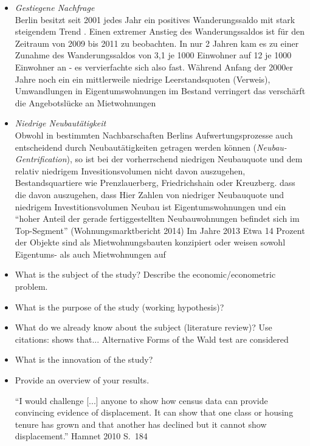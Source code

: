 \begin{itemize}

\item \textit{Gestiegene Nachfrage} \\
  Berlin besitzt seit 2001 jedes Jahr ein positives Wanderungssaldo mit stark steigendem Trend \citep{StatistischesLandesamtSachsen-Anhalt2015}. Einen extremer Anstieg des Wanderungssaldos ist für den Zeitraum von 2009 bis 2011 zu beobachten. In nur 2 Jahren kam es zu einer Zunahme des Wanderungssaldos von 3,1 je 1000 Einwohner auf 12 je 1000 Einwohner an - es vervierfachte sich also fast. Während Anfang der 2000er Jahre noch ein ein mittlerweile niedrige Leerstandsquoten (Verweis), Umwandlungen in Eigentumswohnungen im Bestand verringert das verschärft die Angebotslücke an Mietwohnungen
  \item \textit{Niedrige Neubautätigkeit}\\
    Obwohl in bestimmten Nachbarschaften Berlins Aufwertungsprozesse auch entscheidend durch Neubautätigkeiten getragen werden können (\textit{Neubau-Gentrification}), so ist bei der vorherrschend niedrigen Neubauquote und dem relativ niedrigem Invesitionsvolumen nicht davon auszugehen, Bestandsquartiere wie Prenzlauerberg, Friedrichshain oder Kreuzberg.  dass die davon auszugehen, dass Hier Zahlen von niedriger Neubauquote und niedrigem Investitionsvolumen 
   Neubau ist Eigentumswohnungen und ein "`hoher Anteil der gerade fertiggestellten Neubauwohnungen befindet sich im Top-Segment"' (Wohnungsmarktbericht 2014) Im Jahre 2013 
   Etwa 14 Prozent der Objekte sind als Mietwohnungsbauten konzipiert oder weisen sowohl Eigentums- als auch Mietwohnungen auf



    \item What is the subject of the study? Describe the
        economic/econometric problem.
    \item What is the purpose of the study (working hypothesis)?
    \item What do we already know about the subject (literature
        review)? Use citations: shows that...
        Alternative Forms of the Wald test are considered
    \item What is the innovation of the study?
    \item Provide an overview of your results.
    
"`I would challenge [...] anyone to show how census data can provide convincing evidence of displacement. It can show that one class or housing tenure has grown and that another has declined but it cannot show displacement."' Hamnet 2010 S.~184


\end{itemize}
